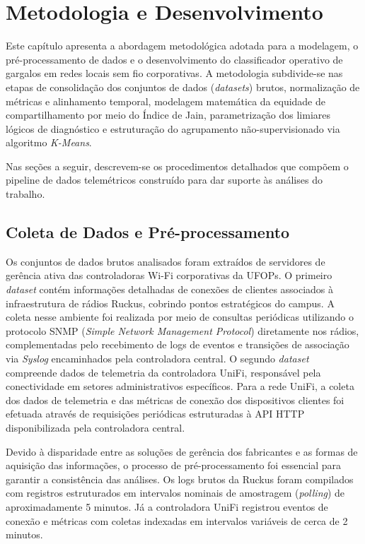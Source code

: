 \chapter{Metodologia e Desenvolvimento}
\label{cap:desenvolvimento}

Este capítulo apresenta a abordagem metodológica adotada para a modelagem, o pré-processamento de dados e o desenvolvimento do classificador operativo de gargalos em redes locais sem fio corporativas. A metodologia subdivide-se nas etapas de consolidação dos conjuntos de dados (\textit{datasets}) brutos, normalização de métricas e alinhamento temporal, modelagem matemática da equidade de compartilhamento por meio do Índice de Jain, parametrização dos limiares lógicos de diagnóstico e estruturação do agrupamento não-supervisionado via algoritmo \textit{K-Means}.

Nas seções a seguir, descrevem-se os procedimentos detalhados que compõem o pipeline de dados telemétricos construído para dar suporte às análises do trabalho.

\section{Coleta de Dados e Pré-processamento}
\label{sec:coleta_dados}

Os conjuntos de dados brutos analisados foram extraídos de servidores de gerência ativa das controladoras Wi-Fi corporativas da \acsp{UFOP}. O primeiro \textit{dataset} contém informações detalhadas de conexões de clientes associados à infraestrutura de rádios Ruckus, cobrindo pontos estratégicos do campus. A coleta nesse ambiente foi realizada por meio de consultas periódicas utilizando o protocolo \acs{SNMP} (\textit{Simple Network Management Protocol}) diretamente nos rádios, complementadas pelo recebimento de logs de eventos e transições de associação via \textit{Syslog} encaminhados pela controladora central. O segundo \textit{dataset} compreende dados de telemetria da controladora UniFi, responsável pela conectividade em setores administrativos específicos. Para a rede UniFi, a coleta dos dados de telemetria e das métricas de conexão dos dispositivos clientes foi efetuada através de requisições periódicas estruturadas à \acs{API} \acs{HTTP} disponibilizada pela controladora central.

Devido à disparidade entre as soluções de gerência dos fabricantes e as formas de aquisição das informações, o processo de pré-processamento foi essencial para garantir a consistência das análises. Os logs brutos da Ruckus foram compilados com registros estruturados em intervalos nominais de amostragem (\textit{polling}) de aproximadamente 5 minutos. Já a controladora UniFi registrou eventos de conexão e métricas com coletas indexadas em intervalos variáveis de cerca de 2 minutos.

